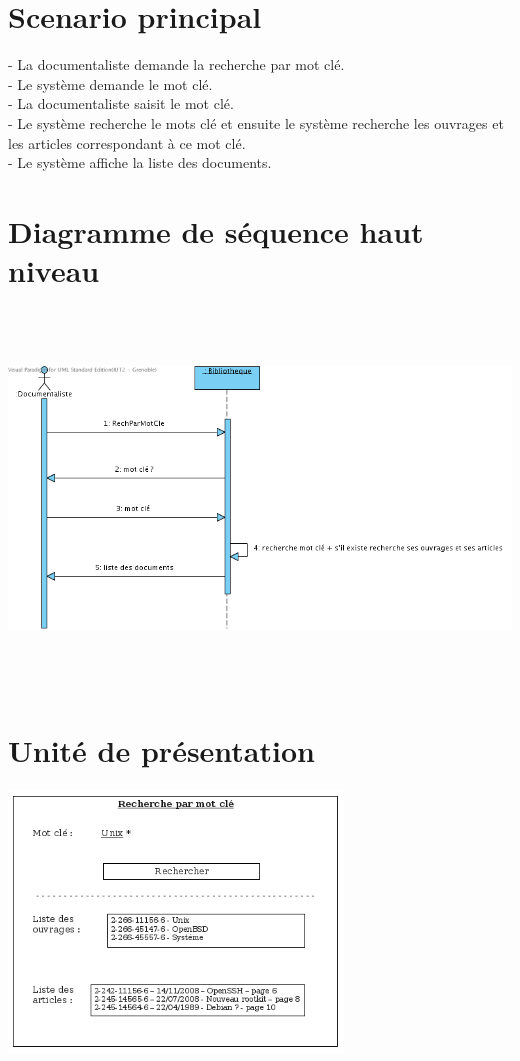 \documentclass[a4paper,10pt]{report}
\begin{document}
\section*{Scenario principal}
\begin{flushleft}
- La documentaliste demande la recherche par mot clé.\\
- Le système demande le mot clé.\\
- La documentaliste saisit le mot clé.\\
- Le système recherche le mots clé et ensuite le système recherche les ouvrages et les articles correspondant à ce mot clé.\\
- Le système affiche la liste des documents.\\
\end{flushleft}

\bigskip

\section*{Diagramme de séquence haut niveau}
\bigskip
\bigskip
\bigskip
\includegraphics[height=100mm]{RechParMotCleHautNiveau.png}

\newpage

\section*{Unité de présentation}
\includegraphics[height=70mm]{UpRechParMotCle.png}
\end{document}
